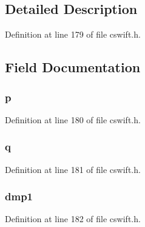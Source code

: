 \subsection{Detailed Description}


Definition at line 179 of file cswift.\+h.



\subsection{Field Documentation}
\subsubsection[{\texorpdfstring{p}{p}}]{ p}\hypertarget{struct___s_w___c_r_t_a60e95aa3174f6d5deec9af8e31301f90}{}\label{struct___s_w___c_r_t_a60e95aa3174f6d5deec9af8e31301f90}


Definition at line 180 of file cswift.\+h.

\subsubsection[{\texorpdfstring{q}{q}}]{ q}\hypertarget{struct___s_w___c_r_t_a21ddbe8b788924d70fb99345656604bb}{}\label{struct___s_w___c_r_t_a21ddbe8b788924d70fb99345656604bb}


Definition at line 181 of file cswift.\+h.

\subsubsection[{\texorpdfstring{dmp1}{dmp1}}]{ dmp1}\hypertarget{struct___s_w___c_r_t_adbee7cc64121b895262c015e7273ca62}{}\label{struct___s_w___c_r_t_adbee7cc64121b895262c015e7273ca62}


Definition at line 182 of file cswift.\+h.

